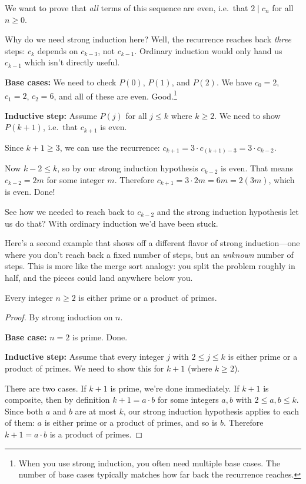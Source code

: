 \documentclass[11pt]{article}
\begin{document}
We want to prove that \emph{all} terms of this sequence are even, i.e.\ that $2 \mid c_n$ for all $n \geq 0$.

Why do we need strong induction here? Well, the recurrence reaches back \emph{three} steps: $c_k$ depends on $c_{k-3}$, not $c_{k-1}$. Ordinary induction would only hand us $c_{k-1}$ which isn't directly useful.

\textbf{Base cases:} We need to check $P(0)$, $P(1)$, and $P(2)$. We have $c_0 = 2$, $c_1 = 2$, $c_2 = 6$, and all of these are even. Good.\footnote{When you use strong induction, you often need multiple base cases. The number of base cases typically matches how far back the recurrence reaches.}

\textbf{Inductive step:} Assume $P(j)$ for all $j \leq k$ where $k \geq 2$. We need to show $P(k+1)$, i.e.\ that $c_{k+1}$ is even.

Since $k+1 \geq 3$, we can use the recurrence: $c_{k+1} = 3 \cdot c_{(k+1)-3} = 3 \cdot c_{k-2}$.

Now $k - 2 \leq k$, so by our strong induction hypothesis $c_{k-2}$ is even. That means $c_{k-2} = 2m$ for some integer $m$. Therefore $c_{k+1} = 3 \cdot 2m = 6m = 2(3m)$, which is even. Done!

See how we needed to reach back to $c_{k-2}$ and the strong induction hypothesis let us do that? With ordinary induction we'd have been stuck.

Here's a second example that shows off a different flavor of strong induction---one where you don't reach back a fixed number of steps, but an \emph{unknown} number of steps. This is more like the merge sort analogy: you split the problem roughly in half, and the pieces could land anywhere below you.

\begin{theorem}
Every integer $n \geq 2$ is either prime or a product of primes.
\end{theorem}

\begin{proof}
By strong induction on $n$.

\textbf{Base case:} $n = 2$ is prime. Done.

\textbf{Inductive step:} Assume that every integer $j$ with $2 \leq j \leq k$ is either prime or a product of primes. We need to show this for $k+1$ (where $k \geq 2$).

There are two cases. If $k+1$ is prime, we're done immediately. If $k+1$ is composite, then by definition $k+1 = a \cdot b$ for some integers $a, b$ with $2 \leq a, b \leq k$. Since both $a$ and $b$ are at most $k$, our strong induction hypothesis applies to each of them: $a$ is either prime or a product of primes, and so is $b$. Therefore $k+1 = a \cdot b$ is a product of primes.
\end{proof}
\end{document}
